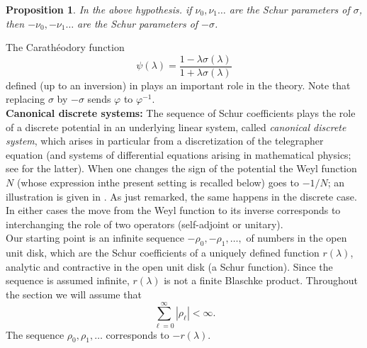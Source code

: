 \documentclass[12pt]{amsart}
\newtheorem{prop}[thm]{Proposition}
\theoremstyle{definition}
\theoremstyle{remark}
\numberwithin{equation}{section}
\begin{document}
                \begin{prop}
In the above hypothesis. if $\nu_0,\nu_1\ldots$ are the Schur parameters of $\sigma$, then $-\nu_0,-\nu_1\ldots$ are the Schur parameters of $-\sigma$.
                  \end{prop}
                  The Carath\'eodory function
                  \begin{equation}
                    \label{vvvv}
                    \psi(\lambda)=  \frac{1-\lambda \sigma(\lambda)}{1+\lambda \sigma(\lambda)}
                  \end{equation}
                  defined (up to an inversion) in \cite[(3.7)]{MR2077215} plays an important role in the theory. Note that  replacing $\sigma$ by $-\sigma$
                  sends $\varphi$ to $\varphi^{-1}$.\\


       {\bf Canonical discrete systems:}
                   The sequence of Schur coefficients plays the role of a discrete potential in an underlying linear system, called {\sl canonical discrete system},
  which arises in particular from a discretization of the telegrapher
 equation (and  systems of differential equations arising in mathematical physics; see \cite{MR1371140,ope-iden} for the latter). When one changes the sign of the potential
 the Weyl function $N$   (whose expression inthe present setting is recalled below)              goes to $-1/N$; an illustration is given in \cite{MR1960423}. As just remarked,
 the same happens in the discrete case. In either cases the move from the Weyl function to its inverse corresponds to interchanging the role of
 two operators (self-adjoint or unitary).\\

Our starting point is an infinite sequence $-\rho_0,-\rho_1,\ldots,$ of numbers in the open unit disk, which are the
      Schur coefficients of a uniquely defined function $r({\lambda})$, analytic and contractive in the open unit disk (a Schur function).
      Since the sequence is assumed infinite, $r({\lambda})$ is not a finite Blaschke product. Throughout the section we will assume that
      \begin{equation}
        \label{wiener}
        \sum_{\ell=0}^\infty |\rho_\ell|<\infty.
\end{equation}
      The sequence $\rho_0,\rho_1,\ldots$ corresponds to $-r({\lambda})$.\smallskip
\end{document}

